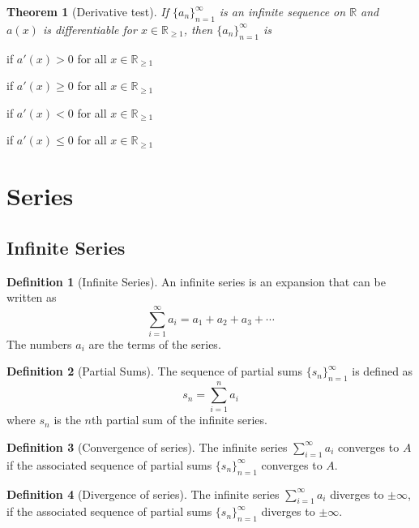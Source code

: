 \documentclass{article}
\newcommand*{\R}{\mathbb{R}}
\theoremstyle{plain}
\newtheorem{theorem}{Theorem}[section]
\numberwithin{theorem}{subsection}
\theoremstyle{definition}
\newtheorem{definition}{Definition}[section]
\numberwithin{definition}{subsection}
\theoremstyle{remark}
\numberwithin{note}{subsection}
\begin{document}
\begin{multicols}{2}
\begin{mdframed}[style=exampledefaultcols,frametitle={Derivative Test}]
		\begin{theorem}[Derivative test]
			If $\{a_n\}^\infty_{n=1}$ is an infinite sequence on $\R$ and
			$a(x)$ is differentiable for $x\in\R_{\geqslant1}$,
			then $\{a_n\}^\infty_{n=1}$ is
		\end{theorem}
		\begin{description}[style=sameline]
			\item[Strictly increasing] if $a'(x) > 0$ for all $x\in\R_{\geqslant 1}$
			\item[Increasing] if $a'(x) \geqslant 0$ for all $x\in\R_{\geqslant 1}$
			\item[Strictly decreasing] if $a'(x) < 0$ for all $x\in\R_{\geqslant 1}$
			\item[Decreasing] if $a'(x) \leqslant 0$ for all $x\in\R_{\geqslant 1}$
		\end{description}
	\end{mdframed}
\end{multicols}
%
\section{Series}
\subsection{Infinite Series}
\begin{multicols}{2}
\begin{definition}[Infinite Series]
	An infinite series is an expansion that can be written as
	\begin{equation*}
		\sum_{i=1}^\infty a_i = a_1 + a_2 + a_3 + \cdots
	\end{equation*}
	The numbers $a_i$ are the terms of the series.
\end{definition}
\begin{definition}[Partial Sums]
	The sequence of partial sums $\{s_n\}_{n=1}^\infty$ is defined as
	\begin{equation*}
		s_n = \sum_{i=1}^n a_i
	\end{equation*}
	where $s_n$ is the $n$th partial sum of the infinite series.
\end{definition}
\columnbreak
\begin{definition}[Convergence of series]
	The infinite series $\sum_{i=1}^\infty a_i$ converges to $A$ if the associated sequence of partial sums $\{s_n\}_{n=1}^\infty$ converges to $A$.
\end{definition}
\begin{definition}[Divergence of series]
	The infinite series $\sum_{i=1}^\infty a_i$ diverges to $\pm\infty$, if the associated sequence of partial sums $\{s_n\}_{n=1}^\infty$ diverges to $\pm\infty$.
\end{definition}
\end{multicols}
%
\pagebreak
%
\end{document}
